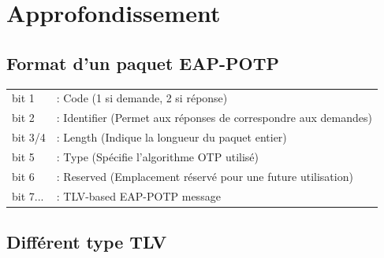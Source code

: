\documentclass{article}
\begin{document}
\section{Approfondissement}

\subsection{Format d'un paquet EAP-POTP}

\begin{tabular}{  l  l  }
	bit 1 &: Code (1 si demande, 2 si réponse)\\
	bit 2 &: Identifier (Permet aux réponses de correspondre aux demandes)\\
	bit 3/4 &: Length (Indique la longueur du paquet entier)\\
	bit 5 &: Type (Spécifie l'algorithme OTP utilisé)\\
	bit 6 &: Reserved (Emplacement réservé pour une future utilisation)\\
	bit 7... &: TLV-based EAP-POTP message \\
\end{tabular}

\subsection{Différent type TLV}
\end{document}
